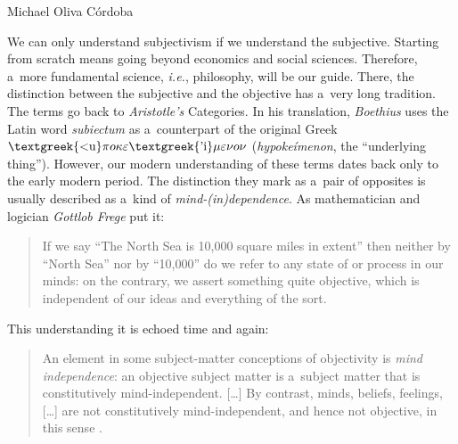 \begin{artengenv}{Michael Oliva Córdoba}

We can only understand subjectivism if we understand the subjective. Starting from scratch means going beyond economics and social sciences. Therefore, a~more fundamental science, \textit{i.e.}, philosophy, will be our guide. There, the distinction between the subjective and the objective has a~very long tradition. The terms go back to \textit{Aristotle's} Categories. In his translation, \textit{Boethius} 
\parencites[cf.][5:22]{minio-paluello_aristoteles_1961}[][\textit{Cat.} 1a20]{aristotle_categories_1938} %
 uses the Latin word \textit{subiectum} as a~counterpart of the original Greek \textit{$\text{\textgreek{<u}}\pi o\kappa \varepsilon \text{\textgreek{'i}}\mu \varepsilon \nu o\nu $} (\textit{hypokeímenon}, the ``underlying thing''). However, our modern understanding of these terms dates back only to the early modern period. The distinction they mark as a~pair of opposites is usually described as a~kind of \textit{mind-(in)dependence}. As mathematician and logician \textit{Gottlob Frege} put it:



\begin{quote}
If we say ``The North Sea is 10,000 square miles in extent'' then neither by ``North Sea'' nor by ``10,000'' do we refer to any state of or process in our minds: on the contrary, we assert something quite objective, which is independent of our ideas and everything of the sort. 
\parencite[][p.34]{frege_foundations_1953}%
\end{quote}




This understanding it is echoed time and again:



\begin{quote}
An element in some subject-matter conceptions of objectivity is \textit{mind independence}: an objective subject matter is a~subject matter that is constitutively mind-independent. […] By contrast, minds, beliefs, feelings, […] are not constitutively mind-independent, and hence not objective, in this sense 
\parencite[][p.46]{burge_origins_2010}.%
\end{quote}





\end{artengenv}
